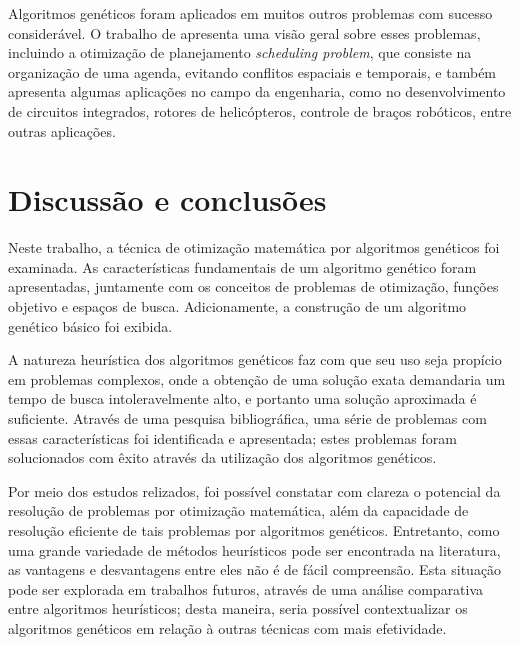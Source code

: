 \documentclass[12pt]{article}
\begin{document}
Algoritmos genéticos foram aplicados em muitos outros problemas com sucesso considerável. O trabalho de \cite{Ross1994} apresenta uma visão geral sobre esses problemas, incluindo a otimização de planejamento \textit{scheduling problem}, que consiste na organização de uma agenda, evitando conflitos espaciais e temporais, e também apresenta algumas aplicações no campo da engenharia, como no desenvolvimento de circuitos integrados, rotores de helicópteros, controle de braços robóticos, entre outras aplicações.

\section{Discussão e conclusões} \label{sec:conclusions}

Neste trabalho, a técnica de otimização matemática por algoritmos genéticos foi examinada. As características fundamentais de um algoritmo genético foram apresentadas, juntamente com os conceitos de problemas de otimização, funções objetivo e espaços de busca. Adicionamente, a construção de um algoritmo genético básico foi exibida.

A natureza heurística dos algoritmos genéticos faz com que seu uso seja propício em problemas complexos, onde a obtenção de uma solução exata demandaria um tempo de busca intoleravelmente alto, e portanto uma solução aproximada é suficiente. Através de uma pesquisa bibliográfica, uma série de problemas com essas características foi identificada e apresentada; estes problemas foram solucionados com êxito através da utilização dos algoritmos genéticos.

Por meio dos estudos relizados, foi possível constatar com clareza o potencial da resolução de problemas por otimização matemática, além da capacidade de resolução eficiente de tais problemas por algoritmos genéticos. Entretanto, como uma grande variedade de métodos heurísticos pode ser encontrada na literatura, as vantagens e desvantagens entre eles não é de fácil compreensão. Esta situação pode ser explorada em trabalhos futuros, através de uma análise comparativa entre algoritmos heurísticos; desta maneira, seria possível contextualizar os algoritmos genéticos em relação à outras técnicas com mais efetividade.



\end{document}
